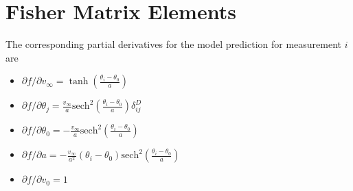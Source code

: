 \documentclass[11pt, oneside]{article}   	%
\begin{document}
\appendix
\section{Fisher Matrix Elements}
\label{sec:fisher}
The corresponding partial derivatives for the model prediction for measurement $i$ are
\begin{itemize}
\item $\partial f/ \partial v_\infty =  \tanh{\left(\frac{\theta_i - \theta_0}{a}\right)}$
\item $\partial f/ \partial\theta_j = \frac{v_\infty }{a} \text{sech}^2{\left(\frac{\theta_i - \theta_0}{a}\right)} \delta^D_{ij}$ 
\item $\partial f/ \partial\theta_0 = -\frac{v_\infty }{a} \text{sech}^2{\left(\frac{\theta_i - \theta_0}{a}\right)}$ 
\item $\partial f/ \partial a =-\frac{v_\infty }{a^2} (\theta_i - \theta_0)\text{sech}^2{\left(\frac{\theta_i - \theta_0}{a}\right)}$
\item $\partial f/ \partial v_0 =1$
\end{itemize}
\end{document}

